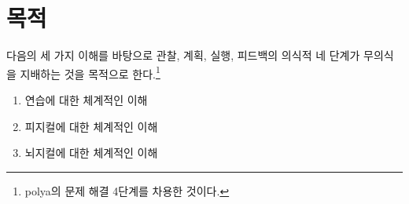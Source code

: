\chapter{목적}{\label{sec:purp}}
다음의 세 가지 이해를 바탕으로 관찰, 계획, 실행, 피드백의 의식적 네 단계가 무의식을 지배하는 것을 목적으로 한다.\footnote{polya의 문제 해결 4단계를 차용한 것이다.}
\begin{enumerate}
    \item 연습에 대한 체계적인 이해
    \item 피지컬에 대한 체계적인 이해
    \item 뇌지컬에 대한 체계적인 이해
\end{enumerate}
	


